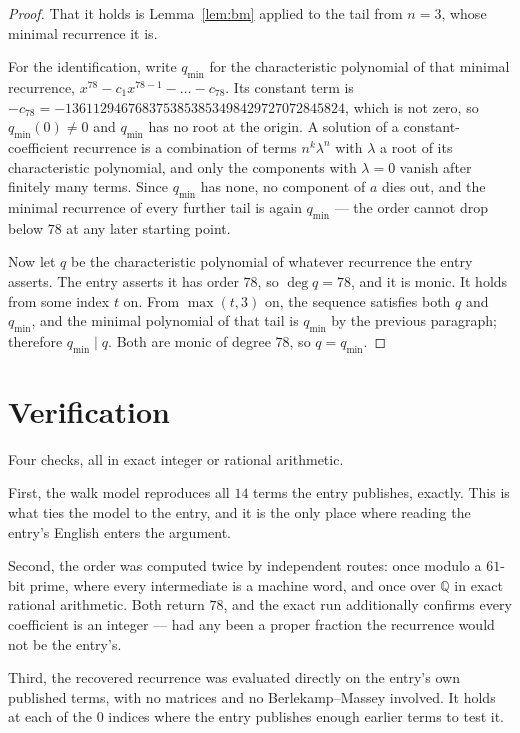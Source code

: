 \documentclass[11pt,a4paper]{article}
\theoremstyle{plain}
\theoremstyle{definition}
\begin{document}
\begin{proof}
That it holds is Lemma~\ref{lem:bm} applied to the tail from $n=3$, whose minimal
recurrence it is.

For the identification, write $q_{\min}$ for the characteristic polynomial of that minimal
recurrence, $x^{78}-c_1x^{78-1}-\dots-c_{78}$. Its constant term is
$-c_{78}=-1361129467683753853853498429727072845824$, which is not zero, so $q_{\min}(0)\neq0$ and $q_{\min}$ has no
root at the origin. A solution of a constant-coefficient recurrence is a combination of terms
$n^{k}\lambda^{n}$ with $\lambda$ a root of its characteristic polynomial, and only the
components with $\lambda=0$ vanish after finitely many terms. Since $q_{\min}$ has none, no
component of $a$ dies out, and the minimal recurrence of every further tail is again
$q_{\min}$ --- the order cannot drop below $78$ at any later starting point.

Now let $q$ be the characteristic polynomial of whatever recurrence the entry asserts. The
entry asserts it has order $78$, so $\deg q=78$, and it is monic. It holds from some
index $t$ on. From $\max(t,3)$ on, the sequence satisfies both $q$ and $q_{\min}$, and
the minimal polynomial of that tail is $q_{\min}$ by the previous paragraph; therefore
$q_{\min}\mid q$. Both are monic of degree $78$, so $q=q_{\min}$.
\end{proof}

\section{Verification}

Four checks, all in exact integer or rational arithmetic.

First, the walk model reproduces all $14$ terms the entry publishes, exactly. This is
what ties the model to the entry, and it is the only place where reading the entry's English
enters the argument.

Second, the order was computed twice by independent routes: once modulo a $61$-bit prime, where
every intermediate is a machine word, and once over $\mathbb{Q}$ in exact rational arithmetic.
Both return $78$, and the exact run additionally confirms every coefficient is an integer
--- had any been a proper fraction the recurrence would not be the entry's.

Third, the recovered recurrence was evaluated directly on the entry's own published terms, with
no matrices and no Berlekamp--Massey involved. It holds at each of the $0$ indices where
the entry publishes enough earlier terms to test it.
\end{document}
